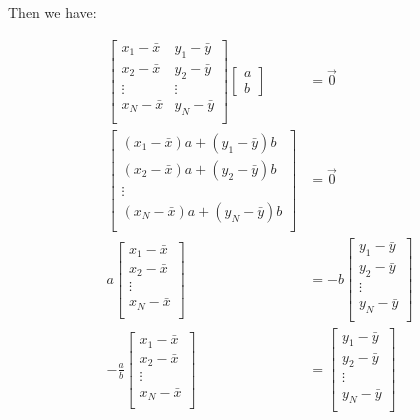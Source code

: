 \documentclass{article}
\begin{document}
Then we have:

\begin{align*}
\begin{bmatrix}
x_1 - \bar{x} & y_1 - \bar{y} \\
x_2 - \bar{x} & y_2 - \bar{y} \\
\vdots        & \vdots        \\
x_N - \bar{x} & y_N - \bar{y} \\
\end{bmatrix} \begin{bmatrix}
a \\
b
\end{bmatrix} &= \overrightarrow{0} \\
\begin{bmatrix}
(x_1 - \bar{x})a + (y_1 - \bar{y})b \\
(x_2 - \bar{x})a + (y_2 - \bar{y})b \\
\vdots \\
(x_N - \bar{x})a + (y_N - \bar{y})b \\
\end{bmatrix} &= \overrightarrow{0} \\
a \begin{bmatrix}
x_1 - \bar{x} \\
x_2 - \bar{x} \\
\vdots \\
x_N - \bar{x} \\
\end{bmatrix} &= -b \begin{bmatrix}
y_1 - \bar{y} \\
y_2 - \bar{y} \\
\vdots \\
y_N - \bar{y} \\
\end{bmatrix} \\
-\frac{a}{b} \begin{bmatrix}
x_1 - \bar{x} \\
x_2 - \bar{x} \\
\vdots \\
x_N - \bar{x} \\
\end{bmatrix} &= \begin{bmatrix}
y_1 - \bar{y} \\
y_2 - \bar{y} \\
\vdots \\
y_N - \bar{y} \\
\end{bmatrix} \\
\end{align*}
\end{document}
